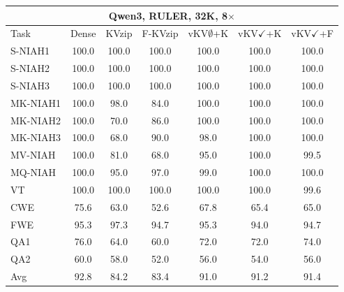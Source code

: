 \begin{tabular}{lcccccc}
\toprule
\multicolumn{7}{c}{Qwen3, RULER, 32K, 8$\times$} \\
\midrule
Task & Dense & KVzip & F-KVzip & vKV$\emptyset$+K & vKV$\checkmark$+K & vKV$\checkmark$+F \\
\midrule
S-NIAH1 & 100.0 & 100.0 & 100.0 & 100.0 & 100.0 & 100.0 \\
S-NIAH2 & 100.0 & 100.0 & 100.0 & 100.0 & 100.0 & 100.0 \\
S-NIAH3 & 100.0 & 100.0 & 100.0 & 100.0 & 100.0 & 100.0 \\
MK-NIAH1 & 100.0 & 98.0 & 84.0 & 100.0 & 100.0 & 100.0 \\
MK-NIAH2 & 100.0 & 70.0 & 86.0 & 100.0 & 100.0 & 100.0 \\
MK-NIAH3 & 100.0 & 68.0 & 90.0 & 98.0 & 100.0 & 100.0 \\
MV-NIAH & 100.0 & 81.0 & 68.0 & 95.0 & 100.0 & 99.5 \\
MQ-NIAH & 100.0 & 95.0 & 97.0 & 99.0 & 100.0 & 100.0 \\
VT & 100.0 & 100.0 & 100.0 & 100.0 & 100.0 & 99.6 \\
CWE & 75.6 & 63.0 & 52.6 & 67.8 & 65.4 & 65.0 \\
FWE & 95.3 & 97.3 & 94.7 & 95.3 & 94.0 & 94.7 \\
QA1 & 76.0 & 64.0 & 60.0 & 72.0 & 72.0 & 74.0 \\
QA2 & 60.0 & 58.0 & 52.0 & 56.0 & 54.0 & 56.0 \\
\midrule
Avg & 92.8 & 84.2 & 83.4 & 91.0 & 91.2 & 91.4 \\
\bottomrule
\end{tabular}
\vspace{0.8em}

